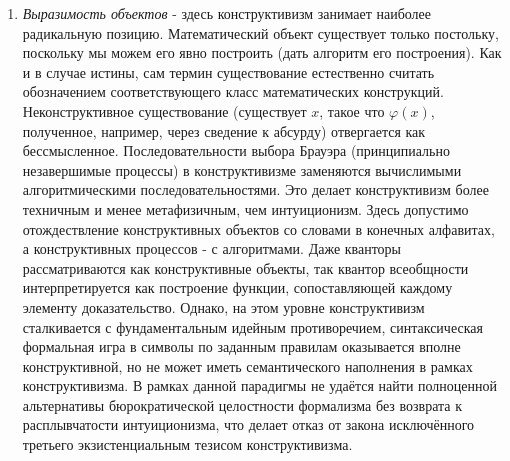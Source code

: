 \documentclass[12pt]{article}
\begin{document}
\begin{enumerate}
    \item {\it Выразимость объектов} - здесь конструктивизм занимает наиболее радикальную позицию. Математический объект существует только постольку, поскольку мы можем его явно построить (дать алгоритм его построения). Как и в случае истины, сам термин существование естественно считать обозначением соответствующего класс математических конструкций. Неконструктивное существование (существует $x$, такое что $\varphi(x)$, полученное, например, через сведение к абсурду) отвергается как бессмысленное. Последовательности выбора Брауэра (принципиально незавершимые процессы) в конструктивизме заменяются вычислимыми алгоритмическими последовательностями. Это делает конструктивизм более техничным и менее метафизичным, чем интуиционизм. Здесь допустимо отождествление конструктивных объектов со словами в конечных алфавитах, а конструктивных процессов - с алгоритмами. Даже кванторы рассматриваются как конструктивные объекты, так квантор всеобщности интерпретируется как построение функции, сопоставляющей каждому элементу доказательство. Однако, на этом уровне конструктивизм сталкивается с фундаментальным идейным противоречием, синтаксическая формальная игра в символы по заданным правилам оказывается вполне конструктивной, но не может иметь семантического наполнения в рамках конструктивизма. В рамках данной парадигмы не удаётся найти полноценной альтернативы бюрократической целостности формализма без возврата к расплывчатости интуиционизма, что делает отказ от закона исключённого третьего экзистенциальным тезисом конструктивизма. 

\end{enumerate}
\end{document}
